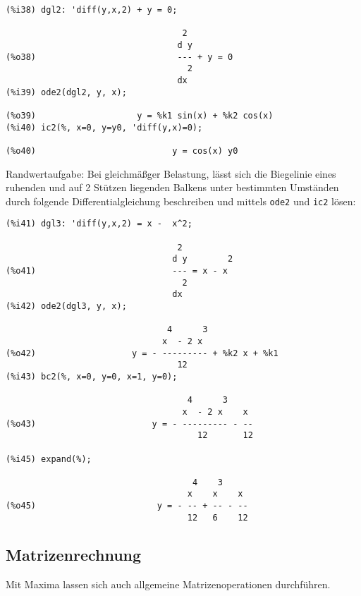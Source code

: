 \documentclass[ngerman,12pt]{scrartcl}
\begin{document}
\begin{verbatim}
(%i38) dgl2: 'diff(y,x,2) + y = 0;

                                   2
                                  d y
(%o38)                            --- + y = 0
                                    2
                                  dx
(%i39) ode2(dgl2, y, x);

(%o39)                    y = %k1 sin(x) + %k2 cos(x)
(%i40) ic2(%, x=0, y=y0, 'diff(y,x)=0);

(%o40)                           y = cos(x) y0
\end{verbatim}

Randwertaufgabe: Bei gleichmäßger Belastung, lässt sich die Biegelinie
eines ruhenden und auf 2 Stützen liegenden Balkens unter bestimmten
Umständen durch folgende Differentialgleichung beschreiben und mittels
\texttt{ode2} und \texttt{ic2} lösen:

\begin{verbatim}
(%i41) dgl3: 'diff(y,x,2) = x -  x^2;

                                  2
                                 d y        2
(%o41)                           --- = x - x
                                   2
                                 dx
(%i42) ode2(dgl3, y, x);

                                4      3
                               x  - 2 x
(%o42)                   y = - --------- + %k2 x + %k1
                                  12
(%i43) bc2(%, x=0, y=0, x=1, y=0);

                                    4      3
                                   x  - 2 x    x
(%o43)                       y = - --------- - --
                                      12       12

(%i45) expand(%);

                                     4    3
                                    x    x    x
(%o45)                        y = - -- + -- - --
                                    12   6    12
\end{verbatim}

\subsection{Matrizenrechnung}

Mit Maxima lassen sich auch allgemeine Matrizenoperationen durchführen.
\end{document}
